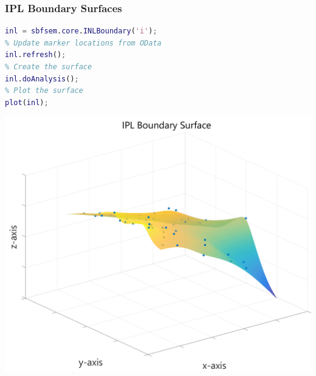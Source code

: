 \documentclass[11pt]{beamer}
\begin{document}
\begin{frame}[fragile]
	\frametitle{IPL Boundary Surfaces}
	\begin{lstlisting}[language=matlab]
inl = sbfsem.core.INLBoundary('i');
% Update marker locations from OData
inl.refresh();
% Create the surface
inl.doAnalysis();
% Plot the surface
plot(inl);\end{lstlisting}
	\begin{center}
		\includegraphics[height=0.4\textheight]{iplboundary}
	\end{center}
\end{frame}
\end{document}
